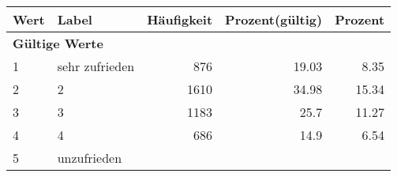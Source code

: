      \begin{longtable}{lXrrr}
     \toprule
     \textbf{Wert} & \textbf{Label} & \textbf{Häufigkeit} & \textbf{Prozent(gültig)} & \textbf{Prozent} \\
     \endhead
     \midrule
     \multicolumn{5}{l}{\textbf{Gültige Werte}}\\

     1 &
     \multicolumn{1}{X}{ sehr zufrieden   } &


       \num{876} &
       \num[round-mode=places,round-precision=2]{19,03} &
         \num[round-mode=places,round-precision=2]{8,35} \\

     2 &
     \multicolumn{1}{X}{ 2   } &


       \num{1610} &
       \num[round-mode=places,round-precision=2]{34,98} &
         \num[round-mode=places,round-precision=2]{15,34} \\

     3 &
     \multicolumn{1}{X}{ 3   } &


       \num{1183} &
       \num[round-mode=places,round-precision=2]{25,7} &
         \num[round-mode=places,round-precision=2]{11,27} \\

     4 &
     \multicolumn{1}{X}{ 4   } &


       \num{686} &
       \num[round-mode=places,round-precision=2]{14,9} &
         \num[round-mode=places,round-precision=2]{6,54} \\

     5 &
     \multicolumn{1}{X}{ unzufrieden   } &



\end{longtable}
